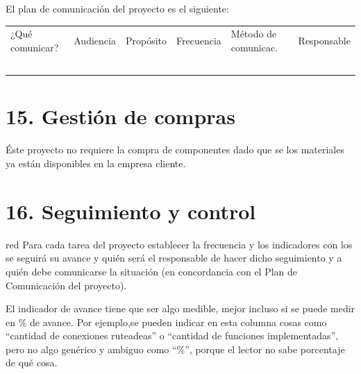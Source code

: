 \documentclass[11pt]{charter}
\begin{document}
El plan de comunicación del proyecto es el siguiente:

\begin{table}[htpb]
\centering
\begin{tabularx}{\linewidth}{@{}|X|C{2.4cm}|C{3cm}|C{1.8cm}|C{2cm}|C{2.1cm}|@{}}
\hline
{} 
           \\ \hline
{} 
¿Qué comunicar? & Audiencia & Propósito & Frecuencia & Método de comunicac. & Responsable \\ \hline
                &           &           &            &                      &             \\ \hline
                &           &           &            &                      &             \\ \hline
                &           &           &            &                      &             \\ \hline
                &           &           &            &                      &             \\ \hline
                &           &           &            &                      &             \\ \hline
\end{tabularx}
\end{table}

\section{15. Gestión de compras}
\label{sec:compras}

Éste proyecto no requiere la compra de componentes dado que se los materiales ya están disponibles en la empresa cliente.

\section{16. Seguimiento y control}
\label{sec:seguimiento}

\begin{consigna}{red}
Para cada tarea del proyecto establecer la frecuencia y los indicadores con los se seguirá su avance y quién será el responsable de hacer dicho seguimiento y a quién debe comunicarse la situación (en concordancia con el Plan de Comunicación del proyecto).

El indicador de avance tiene que ser algo medible, mejor incluso si se puede medir en \% de avance. Por ejemplo,se pueden indicar en esta columna cosas como ``cantidad de conexiones ruteadeas'' o ``cantidad de funciones implementadas'', pero no algo genérico y ambiguo como ``\%'', porque el lector no sabe porcentaje de qué cosa.

\end{consigna}
\end{document}
